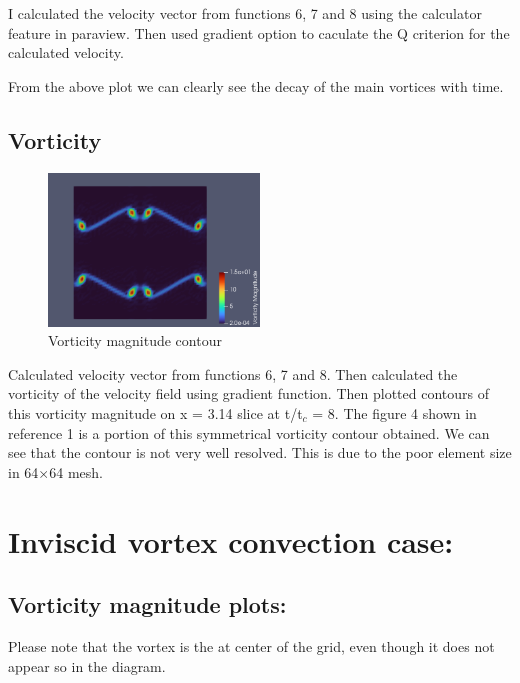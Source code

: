 \documentclass{hcmut-report}
\begin{document}
    I calculated the velocity vector from functions 6, 7 and 8 using the calculator feature in paraview. Then used gradient option to caculate the Q criterion for the calculated velocity.

    From the above plot we can clearly see the decay of the main vortices with time.

    \subsection{Vorticity}
    \begin{figure}[h!]
        \centering
        \includegraphics[width=0.5\textwidth]{graphics/vorticity.png}
        \caption{Vorticity magnitude contour}
        \label{fig:my_label}
    \end{figure}

    Calculated velocity vector from functions 6, 7 and 8. Then calculated the vorticity of the velocity field using gradient function. Then plotted contours of this vorticity magnitude on x = 3.14 slice at t/t$_c$ = 8. The figure 4 shown in reference 1 is a portion of this symmetrical vorticity contour obtained. We can see that the contour is not very well resolved. This is due to the poor element size in 64$\times$64 mesh.

    \newpage
    \section{Inviscid vortex convection case:}

    \subsection{Vorticity magnitude plots: }

    Please note that the vortex is the at center of the grid, even though it does not appear so in the diagram. 
\end{document}
